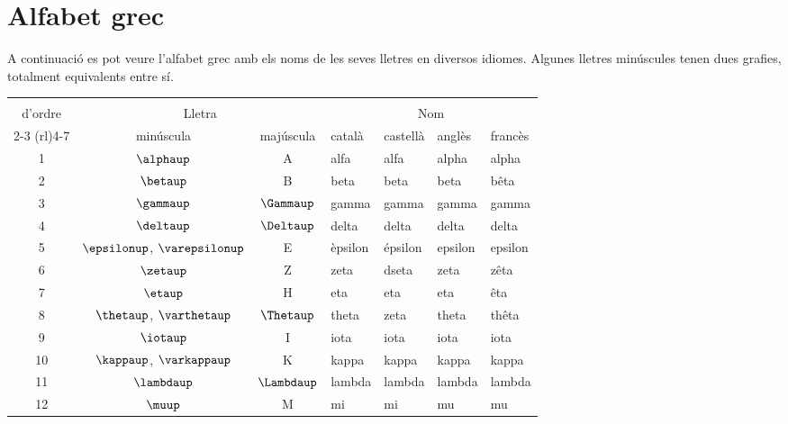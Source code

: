  
 
 
 
 


\section*{Alfabet grec} 

A continuació es pot veure l'alfabet grec
amb els noms de les seves lletres en diversos idiomes. Algunes lletres minúscules tenen dues grafies, totalment equivalents entre sí.

\begin{center}
\begin{threeparttable}
	\begin{tabular}{cccllll}
		\toprule[1pt]
		\renewcommand*{\multirowsetup}{\centering}
		\multirow{2}{15mm}{\rule{0mm}{4.5mm}Número\\d'ordre} & \multicolumn{2}{c}{Lletra} &
		\multicolumn{4}{c}{Nom} \\
		\cmidrule(rl){2-3} \cmidrule(rl){4-7}
		& minúscula & majúscula & català & castellà &  anglès & francès\\
		\midrule
		1  & $\alphaup$ & A & alfa & alfa &  alpha & alpha\\
		2  & $\betaup$ & B & beta & beta &  beta & bêta\\
		3  & $\gammaup$ & $\Gammaup$ & gamma & gamma &  gamma & gamma\\
		4  & $\deltaup$ & $\Deltaup$ & delta & delta &  delta & delta\\
		5  & $\epsilonup$, $\varepsilonup$ & E & èpsilon & épsilon &  epsilon & epsilon\\
		6  & $\zetaup$ & Z & zeta & dseta &  zeta & zêta\\
		7  & $\etaup$ & H & eta & eta &  eta & êta\\
		8  & $\thetaup$, $\varthetaup$ & $\Thetaup$ & theta & zeta &  theta & thêta\\
		9  & $\iotaup$ & I & iota & iota &  iota & iota\\
		10 & $\kappaup$, $\varkappaup$ & K & kappa & kappa &  kappa & kappa\\
		11 & $\lambdaup$ & $\Lambdaup$ & lambda & lambda &  lambda &lambda\\
		12 & $\muup$ & M & mi & mi &  mu & mu\\

\end{tabular}
\end{threeparttable}
\end{center}
